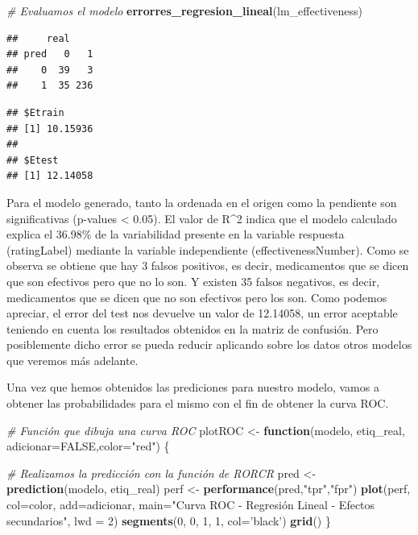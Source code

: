 \documentclass[spanish,]{article}
\newenvironment{Shaded}{\begin{snugshade}}{\end{snugshade}}
\newcommand{\KeywordTok}[1]{\textcolor[rgb]{0.13,0.29,0.53}{\textbf{#1}}}
\newcommand{\DataTypeTok}[1]{\textcolor[rgb]{0.13,0.29,0.53}{#1}}
\newcommand{\DecValTok}[1]{\textcolor[rgb]{0.00,0.00,0.81}{#1}}
\newcommand{\StringTok}[1]{\textcolor[rgb]{0.31,0.60,0.02}{#1}}
\newcommand{\CommentTok}[1]{\textcolor[rgb]{0.56,0.35,0.01}{\textit{#1}}}
\newcommand{\OtherTok}[1]{\textcolor[rgb]{0.56,0.35,0.01}{#1}}
\newcommand{\ControlFlowTok}[1]{\textcolor[rgb]{0.13,0.29,0.53}{\textbf{#1}}}
\newcommand{\NormalTok}[1]{#1}
\begin{document}
\begin{Shaded}
\begin{Highlighting}[]
\CommentTok{# Evaluamos el modelo}
\KeywordTok{errorres_regresion_lineal}\NormalTok{(lm_effectiveness)}
\end{Highlighting}
\end{Shaded}

\begin{verbatim}
##     real
## pred   0   1
##    0  39   3
##    1  35 236
\end{verbatim}

\begin{verbatim}
## $Etrain
## [1] 10.15936
## 
## $Etest
## [1] 12.14058
\end{verbatim}

Para el modelo generado, tanto la ordenada en el origen como la
pendiente son significativas (p-values \textless{} 0.05). El valor de
R\^{}2 indica que el modelo calculado explica el 36.98\% de la
variabilidad presente en la variable respuesta (ratingLabel) mediante la
variable independiente (effectivenessNumber). Como se observa se obtiene
que hay 3 falsos positivos, es decir, medicamentos que se dicen que son
efectivos pero que no lo son. Y existen 35 falsos negativos, es decir,
medicamentos que se dicen que no son efectivos pero los son. Como
podemos apreciar, el error del test nos devuelve un valor de 12.14058,
un error aceptable teniendo en cuenta los resultados obtenidos en la
matriz de confusión. Pero posiblemente dicho error se pueda reducir
aplicando sobre los datos otros modelos que veremos más adelante.

Una vez que hemos obtenidos las prediciones para nuestro modelo, vamos a
obtener las probabilidades para el mismo con el fin de obtener la curva
ROC.

\begin{Shaded}
\begin{Highlighting}[]
\CommentTok{# Función que dibuja una curva ROC}
\NormalTok{plotROC <-}\StringTok{ }\ControlFlowTok{function}\NormalTok{(modelo, etiq_real, }\DataTypeTok{adicionar=}\OtherTok{FALSE}\NormalTok{,}\DataTypeTok{color=}\StringTok{"red"}\NormalTok{) \{ }
  
  \CommentTok{# Realizamos la predicción con la función de RORCR}
\NormalTok{  pred <-}\StringTok{ }\KeywordTok{prediction}\NormalTok{(modelo, etiq_real)}
\NormalTok{  perf <-}\StringTok{ }\KeywordTok{performance}\NormalTok{(pred,}\StringTok{"tpr"}\NormalTok{,}\StringTok{"fpr"}\NormalTok{)}
  \KeywordTok{plot}\NormalTok{(perf, }\DataTypeTok{col=}\NormalTok{color, }\DataTypeTok{add=}\NormalTok{adicionar, }
       \DataTypeTok{main=}\StringTok{"Curva ROC - Regresión Lineal - Efectos secundarios"}\NormalTok{, }\DataTypeTok{lwd =} \DecValTok{2}\NormalTok{) }
  \KeywordTok{segments}\NormalTok{(}\DecValTok{0}\NormalTok{, }\DecValTok{0}\NormalTok{, }\DecValTok{1}\NormalTok{, }\DecValTok{1}\NormalTok{, }\DataTypeTok{col=}\StringTok{'black'}\NormalTok{)}
  \KeywordTok{grid}\NormalTok{() }
\NormalTok{\}}
\end{Highlighting}
\end{Shaded}
\end{document}
